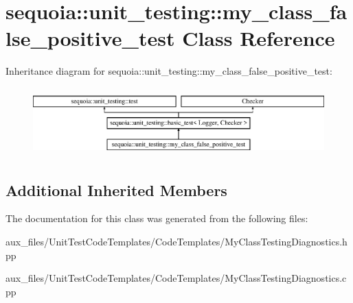 \hypertarget{classsequoia_1_1unit__testing_1_1my__class__false__positive__test}{}\section{sequoia\+::unit\+\_\+testing\+::my\+\_\+class\+\_\+false\+\_\+positive\+\_\+test Class Reference}
\label{classsequoia_1_1unit__testing_1_1my__class__false__positive__test}
Inheritance diagram for sequoia\+::unit\+\_\+testing\+::my\+\_\+class\+\_\+false\+\_\+positive\+\_\+test\+:\begin{figure}[H]
\begin{center}
\leavevmode
\includegraphics[height=2.666667cm]{classsequoia_1_1unit__testing_1_1my__class__false__positive__test}
\end{center}
\end{figure}
\subsection*{Additional Inherited Members}


The documentation for this class was generated from the following files\+:\begin{DoxyCompactItemize}
\item 
aux\+\_\+files/\+Unit\+Test\+Code\+Templates/\+Code\+Templates/My\+Class\+Testing\+Diagnostics.\+hpp\item 
aux\+\_\+files/\+Unit\+Test\+Code\+Templates/\+Code\+Templates/My\+Class\+Testing\+Diagnostics.\+cpp\end{DoxyCompactItemize}

